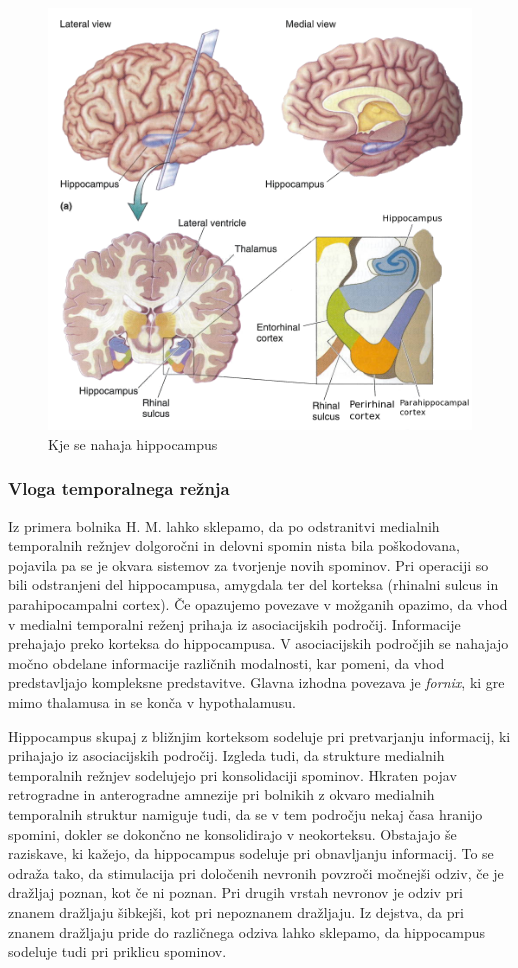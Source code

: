 \documentclass[10pt,a4paper]{article}
\begin{document}
\begin{figure}[h]
  \centering
    \includegraphics[width=1.0\textwidth]{LokacijaHippocampusa.png}
  \caption{Kje se nahaja hippocampus}
  \label{sHippocampus}
\end{figure}

\subsubsection{Vloga temporalnega režnja}
Iz primera bolnika H. M. lahko sklepamo, da po odstranitvi medialnih temporalnih režnjev dolgoročni in delovni spomin nista bila poškodovana, pojavila pa se je okvara sistemov za tvorjenje novih spominov. Pri operaciji so bili odstranjeni del hippocampusa, amygdala ter del korteksa (rhinalni sulcus in parahipocampalni cortex). Če opazujemo povezave v možganih opazimo, da vhod v medialni temporalni reženj prihaja iz asociacijskih področij. Informacije prehajajo preko korteksa do hippocampusa. V asociacijskih področjih se nahajajo močno obdelane informacije različnih modalnosti, kar pomeni, da vhod predstavljajo kompleksne predstavitve. Glavna izhodna povezava je {\it fornix}, ki gre mimo thalamusa in se konča v hypothalamusu.

Hippocampus skupaj z bližnjim korteksom sodeluje pri pretvarjanju informacij, ki prihajajo iz asociacijskih področij. Izgleda tudi, da strukture medialnih temporalnih režnjev sodelujejo pri konsolidaciji spominov. Hkraten pojav retrogradne in anterogradne amnezije pri bolnikih z okvaro medialnih temporalnih struktur namiguje tudi, da se v tem področju nekaj časa hranijo spomini, dokler se dokončno ne konsolidirajo v neokorteksu. Obstajajo še raziskave, ki kažejo, da hippocampus sodeluje pri obnavljanju informacij. To se odraža tako, da stimulacija pri določenih nevronih povzroči močnejši odziv, če je dražljaj poznan, kot če ni poznan. Pri drugih vrstah nevronov je odziv pri znanem dražljaju šibkejši, kot pri nepoznanem dražljaju. Iz dejstva, da pri znanem dražljaju pride do različnega odziva lahko sklepamo, da hippocampus sodeluje tudi pri priklicu spominov.
\end{document}
